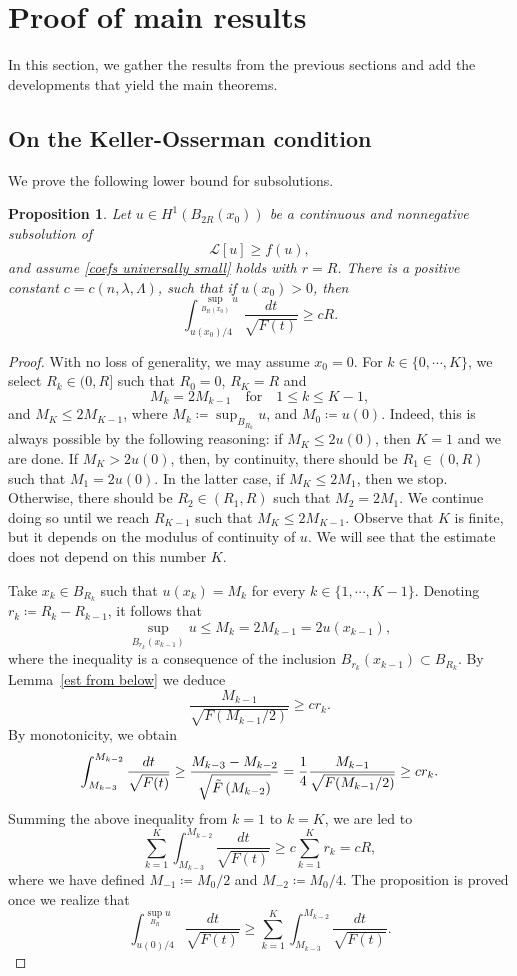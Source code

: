 \documentclass[12pt,a4paper]{amsart}
\numberwithin{equation}{section} %
\newtheorem{proposition}[theorem]{Proposition}
\theoremstyle{definition}
\theoremstyle{remark}
\begin{document}
\section{Proof of main results}

In this section, we gather the results from the previous sections and add the developments that yield the main theorems. 

\subsection{On the Keller-Osserman condition}\label{subsct keller-osserman}

We prove the following lower bound for subsolutions.

\begin{proposition}\label{integral lower bound}
Let $u \in H^1(B_{2R}(x_0))$ be a continuous and nonnegative subsolution of
$$
    \mathcal{L}[u] \geq f(u),
$$
and assume \eqref{coefs universally small} holds with $r = R$. There is a positive constant $c = c(n,\lambda,\Lambda)$, such that if $u(x_0)>0$, then
$$
    \int_{u(x_0)/4}^{\sup_{B_R(x_0)}u}\frac{dt}{\sqrt{F(t)}} \geq cR.
$$
\end{proposition}

\begin{proof}
With no loss of generality, we may assume $x_0 = 0$. For $k \in \{0, \cdots, K\}$, we select $R_k \in (0,R]$ such that $R_0 = 0$, $R_K = R$ and
$$
    M_k = 2M_{k-1} \quad \text{for} \quad 1 \leq k \leq K-1,
$$
and $M_K \leq 2 M_{K-1}$, where $M_k \coloneqq \sup_{B_{R_k}}u$, and $M_0 \coloneqq u(0)$. Indeed, this is always possible by the following reasoning: if $M_K \leq 2u(0)$, then $K=1$ and we are done. If $M_K > 2u(0)$, then, by continuity, there should be $R_1 \in (0,R)$ such that $M_1 = 2u(0)$. In the latter case, if $M_K \leq 2M_1$, then we stop. Otherwise, there should be $R_2 \in (R_1,R)$ such that $M_2 = 2M_1$. We continue doing so until we reach $R_{K-1}$ such that $M_K \leq 2M_{K-1}$. Observe that $K$ is finite, but it depends on the modulus of continuity of $u$. We will see that the estimate does not depend on this number $K$.


Take $x_k \in B_{R_k}$ such that $u(x_k) = M_k$ for every $k \in \{1,\cdots, K-1\}$. Denoting $r_k \coloneqq R_k - R_{k-1}$, it follows that 
$$
    \sup_{B_{r_k}(x_{k-1})}u \leq M_k = 2M_{k-1} = 2u(x_{k-1}),
$$
where the inequality is a consequence of the inclusion $B_{r_k}(x_{k-1}) \subset B_{R_k}$. By Lemma~\ref{est from below} we deduce
$$
    \frac{M_{k-1}}{\sqrt{F(M_{k-1}/2)}} \geq cr_k.
$$
By monotonicity, we obtain
$$
    \int_{M_{k-3}}^{M_{k-2}} \frac{dt}{\sqrt{F(t)}} \geq \frac{M_{k-3}-M_{k-2}}{\sqrt{\Tilde{F}\left(M_{k-2}\right)}} = \frac{1}{4} \frac{M_{k-1}}{\sqrt{F(M_{k-1}/2)}} \geq cr_k.
$$
Summing the above inequality from $k=1$ to $k=K$, we are led to
$$
    \sum_{k=1}^{K} \int_{M_{k-3}}^{M_{k-2}} \frac{dt}{\sqrt{F(t)}} \geq c\sum_{k=1}^{K} r_k = cR,
$$
where we have defined $M_{-1} \coloneqq M_0/2$ and $M_{-2} \coloneqq M_0/4$. The proposition is proved once we realize that
$$
    \int_{u(0)/4}^{\sup_{B_R}u} \frac{dt}{\sqrt{F(t)}} \geq \sum_{k=1}^{K} \int_{M_{k-3}}^{M_{k-2}} \frac{dt}{\sqrt{F(t)}}.
$$
\end{proof}
\end{document}
